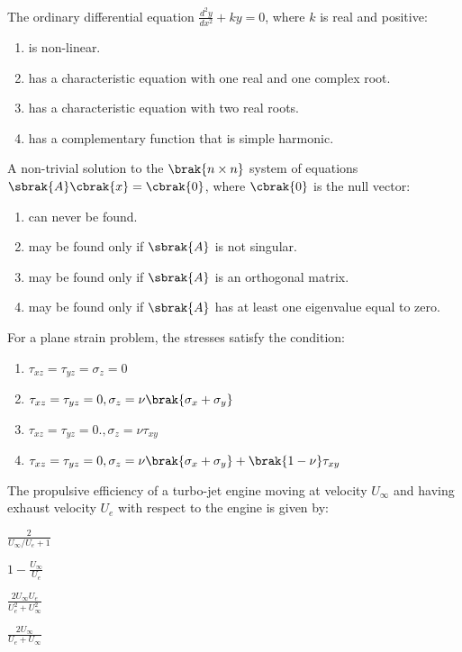 \item The ordinary differential equation $\frac{d^2y}{dx^2}+ky=0$, where $k$ is real and positive:
\begin{enumerate}
\item is non-linear.
\item has a characteristic equation with one real and one complex root.
\item has a characteristic equation with two real roots.
\item has a complementary function that is simple harmonic.
\end{enumerate}
\item A non-trivial solution to the $\brak{n\times n}$ system of equations $\sbrak{A}\cbrak{x} = \cbrak{0}$, where $\cbrak{0}$ is the null vector:
\begin{enumerate}
\item can never be found.
\item may be found only if $\sbrak{A}$ is not singular.
\item may be found only if $\sbrak{A}$ is an orthogonal matrix.
\item may be found only if $\sbrak{A}$ has at least one eigenvalue equal to zero.
\end{enumerate}
\item For a plane strain problem, the stresses satisfy the condition:
\begin{enumerate}
\item $\tau_{xz}=\tau_{yz}=\sigma_z=0$
\item $\tau_{xz}=\tau_{yz}=0,\sigma_z=\nu\brak{\sigma_x+\sigma_y}$
\item $\tau_{xz}=\tau_{yz}=0.,\sigma_z=\nu\tau_{xy}$
\item $\tau_{xz}=\tau_{yz}=0,\sigma_z=\nu\brak{\sigma_x+\sigma_y}+\brak{1-\nu}\tau_{xy}$
\end{enumerate}
\item The propulsive efficiency of a turbo-jet engine moving at velocity $U_\infty$ and having exhaust velocity $U_e$ with respect to the engine is given by:
\begin{enumerate}
\begin{multicols}{4}
\item $\frac{2}{U_\infty/U_e+1}$
\item $1-\frac{U_\infty}{U_e}$
\item  $\frac{2U_\infty U_e}{U_e^2+U_\infty^2}$
\item $\frac{2U_\infty}{U_e+U_\infty}$
\end{multicols}
\end{enumerate}
